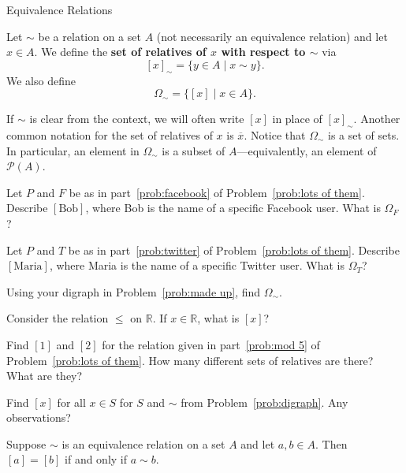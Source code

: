 \begin{section}{Equivalence Relations}
\begin{definition}\label{def:relatives}
Let $\sim$ be a relation on a set $A$ (not necessarily an equivalence relation) and let $x\in A$.  We define the \textbf{set of relatives of $x$ with respect to $\sim$} via
\[
[x]_{\sim}=\{y\in A\mid x\sim y\}.
\]
We also define
\[
\Omega_{\sim}=\{[x]\mid x\in A\}.
\]
\end{definition}

If $\sim$ is clear from the context, we will often write $[x]$ in place of $[x]_{\sim}$. Another common notation for the set of relatives of $x$ is $\overline{x}$. Notice that $\Omega_{\sim}$ is a set of sets.  In particular, an element in $\Omega_{\sim}$ is a subset of $A$---equivalently, an element of $\mathcal{P}(A)$.

\begin{problem}
Let $P$ and $F$ be as in part~\ref{prob:facebook} of Problem~\ref{prob:lots of them}.  Describe $[\text{Bob}]$, where Bob is the name of a specific Facebook user.  What is $\Omega_F$?
\end{problem}

\begin{problem}
Let $P$ and $T$ be as in part~\ref{prob:twitter} of Problem~\ref{prob:lots of them}.  Describe $[\text{Maria}]$, where Maria is the name of a specific Twitter user.  What is $\Omega_T$?
\end{problem}

\begin{problem}
Using your digraph in Problem~\ref{prob:made up}, find $\Omega_{\sim}$.  
\end{problem}

\begin{problem}
Consider the relation $\leq$ on $\mathbb{R}$.  If $x\in \mathbb{R}$, what is $[x]$?
\end{problem}

\begin{problem}\label{prob:mod5classes}
Find $[1]$ and $[2]$ for the relation given in part~\ref{prob:mod 5} of Problem~\ref{prob:lots of them}.  How many different sets of relatives are there?  What are they?
\end{problem}

\begin{problem}
Find $[x]$ for all $x\in S$ for $S$ and $\sim$ from Problem~\ref{prob:digraph}.  Any observations?
\end{problem}

\begin{theorem}\label{thm:related if and only if same class}
Suppose $\sim$ is an equivalence relation on a set $A$ and let $a,b\in A$.  Then $[a]=[b]$ if and only if $a\sim b$.
\end{theorem}


\end{section}
